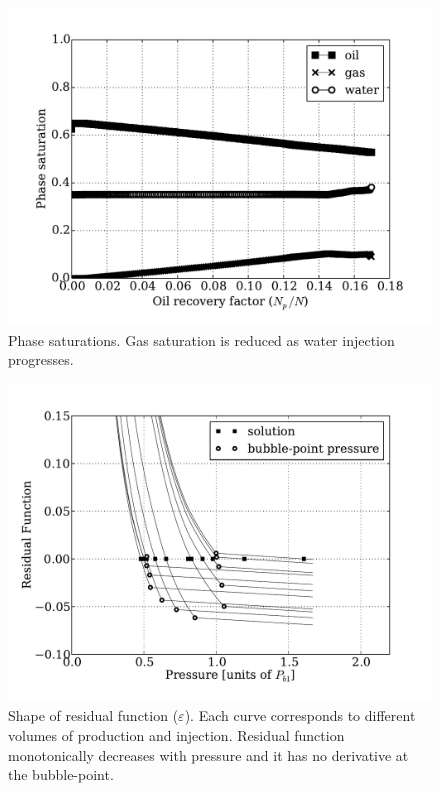 \documentclass[final,authoryear,5p,twocolumn,10pt]{elsarticle}
\begin{document}
\begin{figure}
\centering
\includegraphics[width=\linewidth]{./python/matbal_S}
\caption{Phase saturations. Gas saturation is reduced as water injection progresses.}
\label{fig: matbal_s}
\end{figure}


\begin{figure}
\centering
\includegraphics[width=\linewidth]{./python/matbal_res}
\caption{Shape of residual function ($\varepsilon$). Each curve corresponds to different volumes of production and injection. Residual function monotonically decreases with pressure and it has no derivative at the bubble-point.}
\label{fig: epsilon}
\end{figure}
\end{document}
